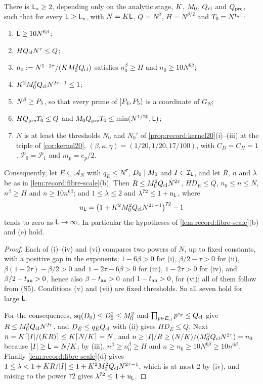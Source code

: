 \begin{lemma}\label{lem:scale-conditions}
There is $\mathsf L_*\ge2$, depending only on the analytic stage, $K$,
$M_0$, $Q_{\rm cl}$ and $Q_{\rm pre}$, such that for every
$\mathsf L\ge\mathsf L_*$, with $N=K\mathsf L$, $Q=N^\beta$, $H=N^{\beta/2}$ and
$T_0=N^{t_{\rm an}}$:
\begin{enumerate}[label=(\roman*)]
\item $\mathsf L\ge10N^{6\beta}$;
\item $HQ_{\rm cl}N^\tau\le Q$;
\item $n_0:=N^{1-2\tau}/(KM_0^2Q_{\rm cl})$ satisfies
 $n_0^\beta\ge H$ and $n_0\ge10N^{6\beta}$;
\item $K^2M_0^2Q_{\rm cl}N^{2\tau-1}\le1$;
\item $N^\beta\ge P_5$, so that every prime of $[P_4,P_5)$ is a
 coordinate of $G_N$;
\item $HQ_{\rm pre}T_0\le Q$ and
 $M_0 Q_{\rm pre}T_0\le\min(N^{1/20},\mathsf L)$;
\item $N$ is at least the thresholds $N_0$ and $N_0'$ of
 \cref{prop:record:kernel20}(i)--(iii) at the triple of
 \cref{cor:kernel20}, $(\beta,\kappa,\eta)=(1/20,1/20,17/100)$, with
 $C_D=C_H=1$, $\mathcal P_0=\mathcal P_1$ and $m_p=e_p/2$.
\end{enumerate}
Consequently, let $E\subseteq\mathcal A_N$ with $q_E\le N^\tau$, $D_0\mid M_0$
and $I\in\mathcal I_\mathsf L$, and let $R$, $n$ and $\lambda$ be as in
\cref{lem:record:fibre-scale}(b). Then $R\le M_0^2Q_{\rm cl}N^{2\tau}$,
$HD_E\le Q$, $n_0\le n\le N$, $n^\beta\ge H$ and $n\ge10n^{6\beta}$; and
$1\le\lambda\le2$ and $\lambda^{72}\le1+u_\mathsf L$, where
\[
 u_\mathsf L=\big(1+K^2M_0^2Q_{\rm cl}N^{2\tau-1}\big)^{72}-1
\]
tends to zero as $\mathsf L\to\infty$. In particular the hypotheses of
\cref{lem:record:fibre-scale}(b) and (e) hold.
\end{lemma}

\begin{proof}
Each of (i)--(iv) and (vi) compares two powers of $N$, up to fixed
constants, with a positive gap in the exponents: $1-6\beta>0$ for (i),
$\beta/2-\tau>0$ for (ii), $\beta(1-2\tau)-\beta/2>0$ and $1-2\tau-6\beta>0$
for (iii), $1-2\tau>0$ for (iv), and $\beta/2-t_{\rm an}>0$, hence also
$\beta-t_{\rm an}>0$ and $1-t_{\rm an}>0$, for (vi); all of them follow from
(S5). Conditions (v) and (vii) are fixed thresholds. So all seven hold for
large $\mathsf L$.

For the consequences, $\operatorname{sq}(D_0)\le D_0^2\le M_0^2$ and
$\prod_{p\in E_{\rm cl}}p^{e_p}\le Q_{\rm cl}$ give
$R\le M_0^2Q_{\rm cl}N^{2\tau}$, and $D_E\le q_EQ_{\rm cl}$ with (ii) gives
$HD_E\le Q$. Next $n=K\lceil|I|/(K R)\rceil\le K\lceil N/K\rceil=N$,
and $n\ge|I|/R\ge(N/K)/(M_0^2Q_{\rm cl}N^{2\tau})=n_0$ because
$|I|\ge\mathsf L=N/K$; by (iii), $n^\beta\ge n_0^\beta\ge H$ and
$n\ge n_0\ge10N^{6\beta}\ge10n^{6\beta}$. Finally
\cref{lem:record:fibre-scale}(d) gives
$1\le\lambda<1+K R/|I|\le1+K^2M_0^2Q_{\rm cl}N^{2\tau-1}$, which is
at most $2$ by (iv), and raising to the power $72$ gives
$\lambda^{72}\le1+u_\mathsf L$.
\end{proof}

